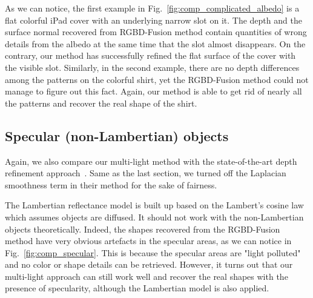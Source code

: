 As we can notice, the first example in Fig.~\ref{fig:comp_complicated_albedo} is a flat colorful iPad cover with an underlying narrow slot on it.
The depth and the surface normal recovered from RGBD-Fusion method contain quantities of wrong details from the albedo at the same time that the slot almost disappears.
On the contrary, our method has successfully refined the flat surface of the cover with the visible slot.
Similarly, in the second example, there are no depth differences among the patterns on the colorful shirt, yet the RGBD-Fusion method could not manage to figure out this fact.
Again, our method is able to get rid of nearly all the patterns and recover the real shape of the shirt. 

\subsection{Specular (non-Lambertian) objects}
Again, we also compare our multi-light method with the state-of-the-art depth refinement approach~\cite{or2015rgbd}.
Same as the last section, we turned off the Laplacian smoothness term in their method for the sake of fairness.

The Lambertian reflectance model is built up based on the Lambert's cosine law which assumes objects are diffused.
It should not work with the non-Lambertian objects theoretically.
Indeed, the shapes recovered from the RGBD-Fusion method have very obvious artefacts in the specular areas, as we can notice in Fig.~\ref{fig:comp_specular}.
This is because the specular areas are "light polluted" and no color or shape details can be retrieved.
However, it turns out that our multi-light approach can still work well and recover the real shapes with the presence of specularity, although the Lambertian model is also applied.

